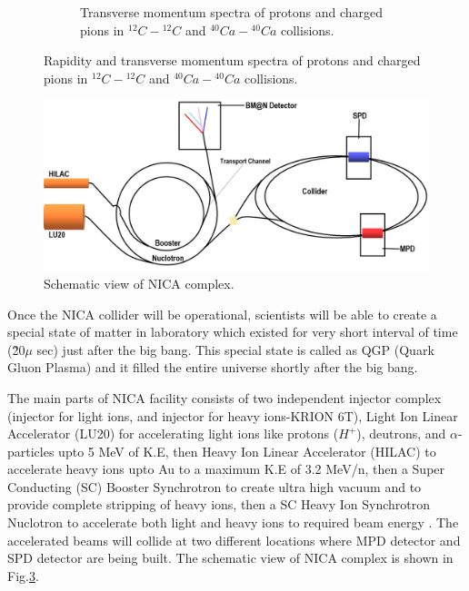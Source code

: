 \documentclass[12pt, twocolumn]{article}
\begin{document}
\begin{figure}[H]
\begin{subfigure}[h]{0.49\textwidth}
\caption{Transverse momentum spectra of protons and charged pions in $^{12}C-{^{12}C}$ and $^{40}Ca-{^{40}Ca}$ collisions.}
\label{ABRAMOV_Paper_Fig.37}
\end{subfigure}
\caption{Rapidity and transverse momentum spectra of protons and charged pions in $^{12}C-{^{12}C}$ and $^{40}Ca-{^{40}Ca}$ collisions.}
\label{ABRAMOV_Paper_Fig.36 and Fig.37}
\end{figure}

\begin{figure}[h]
\centering
\includegraphics[scale=0.3]{NICA_Collider.png}
\caption{Schematic view of NICA complex.}
\label{Schematic view of NICA complex.}
\end{figure}
 
  Once the NICA collider will be operational, scientists will be able to create a special state of matter in laboratory which existed for very short interval of time (\~20$\mu$ sec) just after the big bang. This special state is called as QGP (Quark Gluon Plasma) and it filled the entire universe shortly after the big bang.

The main parts of NICA facility consists of two independent injector complex (injector for light ions, and injector for heavy ions-KRION 6T), Light Ion Linear Accelerator (LU20) for accelerating light ions like protons ($H^{+}$), deutrons, and $\alpha$-particles upto 5 MeV of K.E, then Heavy Ion Linear Accelerator (HILAC) to accelerate heavy ions upto Au to a maximum K.E of 3.2 MeV/n, then a Super Conducting (SC) Booster Synchrotron to create ultra high vacuum and to provide complete stripping of heavy ions, then a SC Heavy Ion Synchrotron Nuclotron to accelerate both light and heavy ions to required beam energy \cite{kekelidze2017nica}. The accelerated beams will collide at two different locations where MPD detector and SPD detector are being built. The schematic view of NICA complex is shown in Fig.\ref{Schematic view of NICA complex.}.
\end{document}
